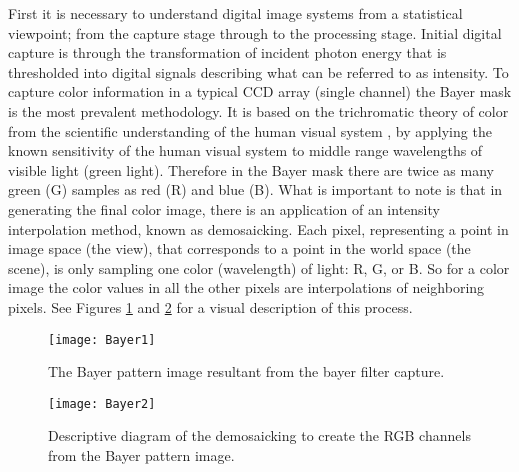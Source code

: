 %
%
%
%
%
%
%
%
%

%
%
%



First it is necessary to understand digital image systems from a statistical viewpoint; from the capture stage through to the processing stage. Initial digital capture is through the transformation of incident photon energy that is thresholded into digital signals describing what can be referred to as intensity. To capture color information in a typical CCD array (single channel) the Bayer mask is the most prevalent methodology. It is based on the trichromatic theory of color from the scientific understanding of the human visual system \cite{Palmer1999}, by applying the known sensitivity of the human visual system to middle range wavelengths of visible light (green light). Therefore in the Bayer mask there are twice as many green (G) samples as red (R) and blue (B). What is important to note is that in generating the final color image, there is an application of an intensity interpolation method, known as demosaicking. Each pixel, representing a point in image space (the view), that corresponds to a point in the world space (the scene), is only sampling one color (wavelength) of light: R, G, or B. So for a color image the color values in all the other pixels are interpolations of neighboring pixels. See Figures \ref{Bayer1} and \ref{Bayer2} for a visual description of this process.
 
\begin{figure}[!h]
\centering
\texttt{[image: Bayer1]}
\caption{The Bayer pattern image resultant from the bayer filter capture.}
\label{Bayer1}
\end{figure}
 
\begin{figure}[!h]
\centering
\texttt{[image: Bayer2]}
\caption{Descriptive diagram of the demosaicking to create the RGB channels from the Bayer pattern image.}
\label{Bayer2}
\end{figure}

